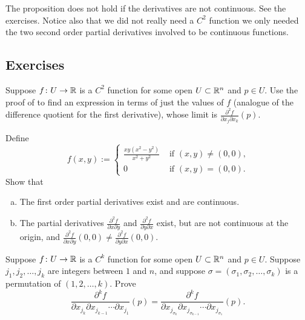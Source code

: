 The proposition does not hold if the derivatives are not
continuous.  See the exercises.
Notice also that we did not really need a $C^2$ function we only needed the
two second order partial derivatives involved to be continuous functions.

\subsection{Exercises}

\begin{exercise}
Suppose $f \colon U \to {\mathbb{R}}$ is a $C^2$ function for some open $U \subset
{\mathbb{R}}^n$ and $p \in U$.
Use the proof of  to find an expression
in terms of just the values of $f$ (analogue of the difference quotient
for the first derivative), whose limit is
$\frac{\partial^2 f}{ \partial x_j \partial x_k}(p)$.
\end{exercise}

\begin{exercise}
Define
\begin{equation*}
f(x,y) :=
\begin{cases}
\frac{xy(x^2-y^2)}{x^2+y^2} & \text{ if $(x,y) \not= (0,0)$,}\\
0 & \text{ if $(x,y) = (0,0)$.}
\end{cases}
\end{equation*}
Show that
\begin{enumerate}[a)]
\item
The first order partial derivatives exist and are continuous.
\item
The partial derivatives
$\frac{\partial^2 f}{\partial x \partial y}$ and
$\frac{\partial^2 f}{\partial y \partial x}$ exist, but are not continuous
at the origin, and 
$\frac{\partial^2 f}{\partial x \partial y}(0,0) \not= 
\frac{\partial^2 f}{\partial y \partial x}(0,0)$.
\end{enumerate}
\end{exercise}

\begin{exercise}
Suppose $f \colon U \to {\mathbb{R}}$ is a $C^k$ function for some open $U \subset
{\mathbb{R}}^n$ and $p \in U$.  Suppose $j_1,j_2,\ldots,j_k$ are integers between $1$
and $n$, and suppose $\sigma=(\sigma_1,\sigma_2,\ldots,\sigma_k)$ is a
permutation of $(1,2,\ldots,k)$.  Prove
\begin{equation*}
\frac{\partial^{k} f}{\partial x_{j_{k}} \partial x_{j_{k-1}}
\cdots \partial x_{j_1}} (p)
=
\frac{\partial^{k} f}{\partial x_{j_{\sigma_k}} \partial
x_{j_{\sigma_{k-1}}}
\cdots \partial x_{j_{\sigma_1}}} (p) .
\end{equation*}
\end{exercise}

